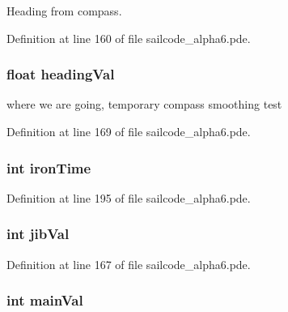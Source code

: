 \-Heading from compass. 



\-Definition at line 160 of file sailcode\-\_\-alpha6.\-pde.

\hypertarget{group__group1_ga8d6cfa64e358c393d2d13c5a9803e052}{
\subsubsection[{heading\-Val}]{\setlength{\rightskip}{0pt plus 5cm}float {\bf heading\-Val}}}
\label{group__group1_ga8d6cfa64e358c393d2d13c5a9803e052}


where we are going, temporary compass smoothing test 



\-Definition at line 169 of file sailcode\-\_\-alpha6.\-pde.

\hypertarget{group__group1_ga332365589e9af9d8ec4d1c5663034132}{
\subsubsection[{iron\-Time}]{\setlength{\rightskip}{0pt plus 5cm}int {\bf iron\-Time}}}
\label{group__group1_ga332365589e9af9d8ec4d1c5663034132}


\-Definition at line 195 of file sailcode\-\_\-alpha6.\-pde.

\hypertarget{group__group1_ga1fee0a7eb4ae243dcc5afe20f508990e}{
\subsubsection[{jib\-Val}]{\setlength{\rightskip}{0pt plus 5cm}int {\bf jib\-Val}}}
\label{group__group1_ga1fee0a7eb4ae243dcc5afe20f508990e}


\-Definition at line 167 of file sailcode\-\_\-alpha6.\-pde.

\hypertarget{group__group1_ga3c5dac52b53dc3642a843a7d6a9266ca}{
\subsubsection[{main\-Val}]{\setlength{\rightskip}{0pt plus 5cm}int {\bf main\-Val}}}
\label{group__group1_ga3c5dac52b53dc3642a843a7d6a9266ca}


